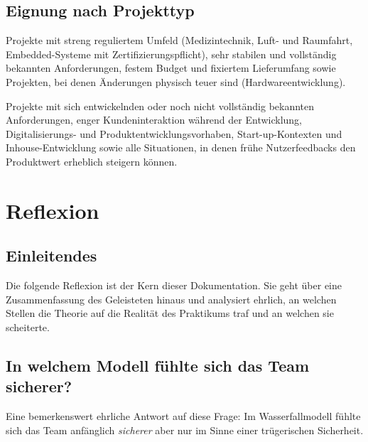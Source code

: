 \documentclass[12pt, a4paper, twoside]{report}
\begin{document}
\section{Eignung nach Projekttyp}

\begin{description}[leftmargin=2em, style=nextline]
  \item[Wasserfall eignet sich für:]
    Projekte mit streng reguliertem Umfeld (Medizintechnik, Luft- und Raumfahrt,
    Embedded-Systeme mit Zertifizierungspflicht), sehr stabilen und vollständig
    bekannten Anforderungen, festem Budget und fixiertem Lieferumfang sowie
    Projekten, bei denen Änderungen physisch teuer sind (Hardwareentwicklung).

  \item[Scrum eignet sich für:]
    Projekte mit sich entwickelnden oder noch nicht vollständig bekannten Anforderungen,
    enger Kundeninteraktion während der Entwicklung, Digitalisierungs- und
    Produktentwicklungsvorhaben, Start-up-Kontexten und Inhouse-Entwicklung sowie
    alle Situationen, in denen frühe Nutzerfeedbacks den Produktwert erheblich steigern können.
\end{description}

\chapter{Reflexion}
\label{chap:reflexion}

\section{Einleitendes}

Die folgende Reflexion ist der Kern dieser Dokumentation. Sie geht über eine
Zusammenfassung des Geleisteten hinaus und analysiert ehrlich, an welchen Stellen die
Theorie auf die Realität des Praktikums traf \textendash{} und an welchen sie scheiterte.

\section{In welchem Modell fühlte sich das Team sicherer?}

Eine bemerkenswert ehrliche Antwort auf diese Frage: Im Wasserfallmodell fühlte sich das
Team anfänglich \textit{sicherer} \textendash{} aber nur im Sinne einer trügerischen Sicherheit.
\end{document}
